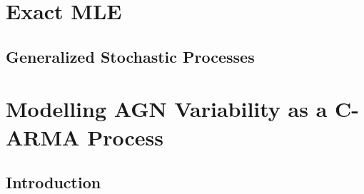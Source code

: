 \documentclass[hyperref={pdfpagelabels=false}]{beamer}
\begin{document}
\section{Exact MLE}

\subsection{Generalized Stochastic Processes}

\section{Modelling AGN Variability as a C-ARMA Process}

\subsection{Introduction}
\end{document}

